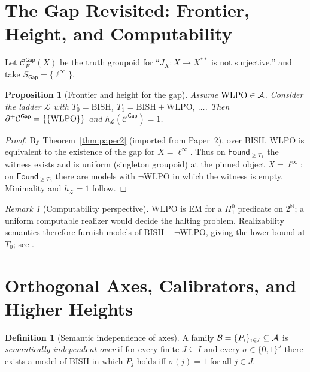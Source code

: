 \documentclass[11pt]{article}
\newtheorem{proposition}[theorem]{Proposition}
\theoremstyle{definition}
\newtheorem{definition}[theorem]{Definition}
\theoremstyle{remark}
\newtheorem{remark}[theorem]{Remark}
\newcommand{\N}{\mathbb{N}}
\newcommand{\linf}{\ell^\infty}
\newcommand{\WLPO}{\mathrm{WLPO}}
\newcommand{\BISH}{\mathrm{BISH}}
\newcommand{\Found}{\mathsf{Found}}
\begin{document}
\section{The Gap Revisited: Frontier, Height, and Computability}\label{p2:sec:gap}

Let \(\mathcal C^{\mathsf{Gap}}_F(X)\) be the truth groupoid for
``\(J_X:X\to X^{**}\) is not surjective,'' and take \(S_{\mathsf{Gap}}=\{\linf\}\).

\begin{proposition}[Frontier and height for the gap]\label{p2:prop:gap-frontier}
Assume \(\WLPO\in\Axis\). Consider the ladder \(\mathcal L\) with
\(T_0=\BISH\), \(T_1=\BISH+\WLPO\), \(\dots\).
Then \(\Frontierpos\mathcal C^{\mathsf{Gap}}=\{\{\WLPO\}\}\) and
\(h_{\mathcal L}(\mathcal C^{\mathsf{Gap}})=1\).
\end{proposition}

\begin{proof}
By Theorem~\ref{thm:paper2} (imported from Paper~2), over \(\BISH\),
\(\WLPO\) is equivalent to the existence of the gap for \(X=\linf\).
Thus on \(\Found_{\ge T_1}\) the witness exists and is uniform (singleton groupoid)
at the pinned object \(X=\linf\); on \(\Found_{\ge T_0}\) there are models with \(\neg\WLPO\) in which the witness is empty. Minimality and \(h_{\mathcal L}=1\) follow.
\end{proof}

\begin{remark}[Computability perspective]\label{p2:rem:computability}
WLPO is EM for a \(\Pi^0_1\) predicate on \(2^\N\); a uniform computable realizer would decide the halting problem. Realizability semantics therefore furnish models of \(\BISH+\neg\WLPO\), giving the lower bound at \(T_0\); see \cite{BridgesRichman,Ishihara06}.
\end{remark}

\section{Orthogonal Axes, Calibrators, and Higher Heights}\label{p2:sec:higher}

\begin{definition}[Semantic independence of axes]\label{p2:def:independence}
A family \(\mathcal{B}=\{P_i\}_{i\in I}\subseteq\mathcal{A}\) is \emph{semantically independent over \BISH} if for every finite \(J\subseteq I\) and every \(\sigma\in\{0,1\}^J\) there exists a model of \(\BISH\) in which \(P_j\) holds iff \(\sigma(j)=1\) for all \(j\in J\).
\end{definition}
\end{document}
